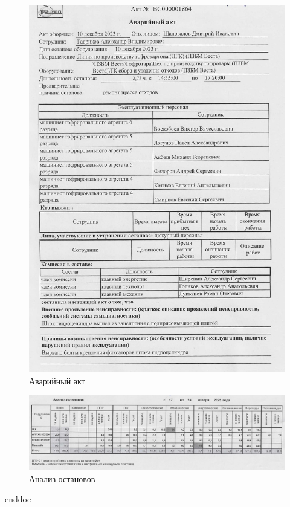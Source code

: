 \begin{figure}
\begin{center}
 \includegraphics[height=0.9\textheight, keepaspectratio]{Pics/XII.7.jpg}
\end{center}
 \caption{Аварийный акт}
 \label{pic:XII.7.jpg}
\end{figure}

\begin{figure}
\begin{center}
 \includegraphics[height=0.2\textheight, keepaspectratio]{Pics/XII.8.jpg}
\end{center}
 \caption{Анализ остановов}
 \label{pic:XII.8.jpg}
\end{figure}
\clearpage
 {enddoc}